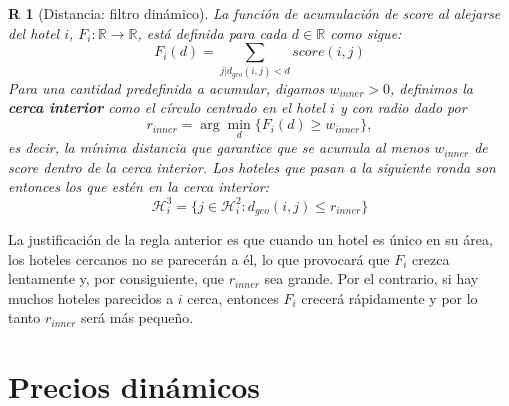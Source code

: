 \documentclass[12pt]{report}
\newcommand{\R}{\mathbb{R}}
\newcommand{\HH}{\mathcal{H}}
\newtheorem{regla}{R}%
\begin{document}
\begin{regla}[Distancia: filtro dinámico] \label{r:distanciadinamica}
La función de acumulación de score al alejarse del hotel $i$, $F_i: \R \to \R$, está definida para cada $d \in \R$ como sigue:
\[
F_i(d) = \sum_{j | d_{geo}(i,j) < d} score(i,j)
\]
Para una cantidad predefinida a acumular, digamos $w_{inner} > 0$, definimos la \textbf{cerca interior} como el círculo centrado en el hotel $i$ y con radio dado por
\[
r_{inner} = \arg\min_d \{F_i(d) \geq w_{inner}\},
\]
es decir, la mínima distancia que garantice que se acumula al menos $w_{inner}$ de \emph{score} dentro de la cerca interior. Los hoteles que pasan a la siguiente ronda son entonces los que estén en la cerca interior:
\[
\HH_i^3 = \{j \in \HH_i^2 : d_{geo}(i,j) \leq r_{inner}\}
\]
\end{regla}
La justificación de la regla anterior es que cuando un hotel es único en su área, los hoteles cercanos no se parecerán a él, lo que provocará que $F_i$ crezca lentamente y, por consiguiente, que $r_{inner}$ sea grande. Por el contrario, si hay muchos hoteles parecidos a $i$ cerca, entonces $F_i$ crecerá rápidamente y por lo tanto $r_{inner}$ será más pequeño.

\section{Precios dinámicos}
\end{document}
